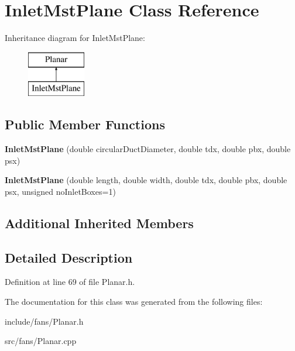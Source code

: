 \hypertarget{class_inlet_mst_plane}{}\section{Inlet\+Mst\+Plane Class Reference}
\label{class_inlet_mst_plane}
Inheritance diagram for Inlet\+Mst\+Plane\+:\begin{figure}[H]
\begin{center}
\leavevmode
\includegraphics[height=2.000000cm]{d6/d96/class_inlet_mst_plane}
\end{center}
\end{figure}
\subsection*{Public Member Functions}
\begin{DoxyCompactItemize}
\item 
\mbox{\label{class_inlet_mst_plane_a28e49257446ce8eaffe85e5208a37679}} 
{\bfseries Inlet\+Mst\+Plane} (double circular\+Duct\+Diameter, double tdx, double pbx, double psx)
\item 
\mbox{\label{class_inlet_mst_plane_a696076ed8762ed835b394709db88611a}} 
{\bfseries Inlet\+Mst\+Plane} (double length, double width, double tdx, double pbx, double psx, unsigned no\+Inlet\+Boxes=1)
\end{DoxyCompactItemize}
\subsection*{Additional Inherited Members}


\subsection{Detailed Description}


Definition at line 69 of file Planar.\+h.



The documentation for this class was generated from the following files\+:\begin{DoxyCompactItemize}
\item 
include/fans/Planar.\+h\item 
src/fans/Planar.\+cpp\end{DoxyCompactItemize}
